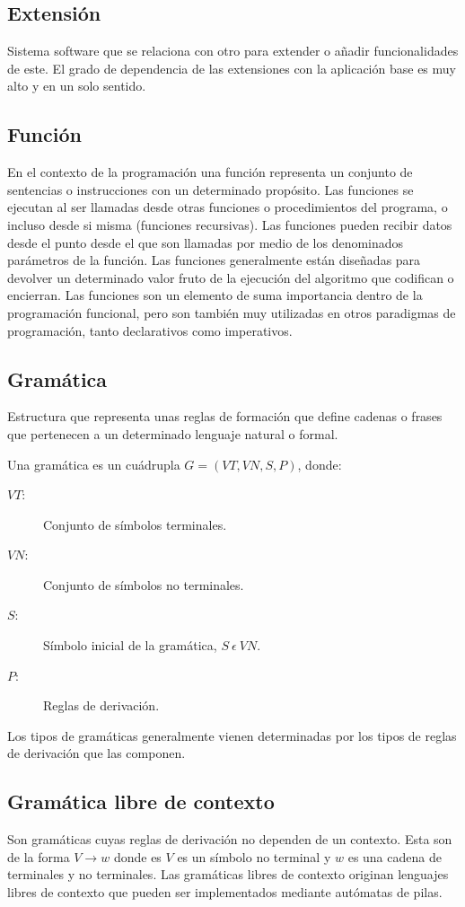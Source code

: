 \subsection {Extensión}
Sistema software que se relaciona con otro para extender o añadir funcionalidades de este. El grado de dependencia de las extensiones con la
aplicación base es muy alto y en un solo sentido. 

\subsection{Función}
En el contexto de la programación una función representa un conjunto de sentencias o instrucciones con un determinado propósito. Las funciones se ejecutan al ser llamadas desde otras
funciones o procedimientos del programa, o incluso desde si misma (funciones recursivas). Las funciones pueden recibir datos desde el punto desde el que son llamadas por medio de los 
denominados parámetros de la función. Las funciones generalmente están diseñadas para devolver un determinado 
valor fruto de la ejecución del algoritmo que codifican o encierran. Las funciones son un elemento de suma importancia dentro de la programación funcional, pero son también muy utilizadas en otros paradigmas de programación, 
tanto declarativos como imperativos. 

\subsection {Gramática}
Estructura que representa unas reglas de formación que define cadenas o frases que pertenecen a un determinado lenguaje natural o formal. 

Una gramática es un cuádrupla $ G = (VT, VN, S, P) $, donde: 

\begin {description}
\item[$VT$:] Conjunto de símbolos terminales.
\item[$VN$:] Conjunto de símbolos no terminales.
\item[$S$:] Símbolo inicial de la gramática, $S\ \epsilon\ VN$.
\item[$P$:] Reglas de derivación.
\end{description}

Los tipos de gramáticas generalmente vienen determinadas por los tipos de reglas de derivación que las componen.

\subsection {Gramática libre de contexto}
Son gramáticas cuyas reglas de derivación no dependen de un contexto. Esta son de la 
forma $V\rightarrow w$ donde es $V$ es un símbolo no terminal y $w$ es una cadena de terminales y no terminales.
Las gramáticas libres de contexto originan lenguajes libres de contexto que pueden ser implementados mediante
autómatas de pilas. 

